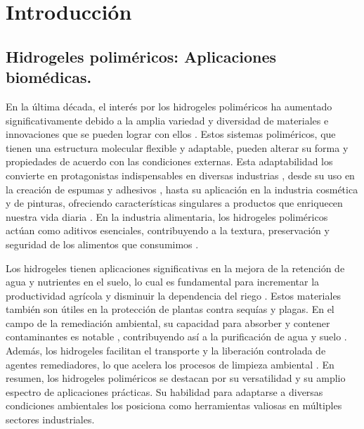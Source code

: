 
\chapter{Introducci\'on}
\label{Chapter1} %



\section{Hidrogeles polim\'ericos: Aplicaciones biom\'edicas.} 

En la \'ultima d\'ecada, el inter\'es por los hidrogeles polim\'ericos ha aumentado significativamente debido a la amplia variedad y diversidad de materiales e innovaciones que se pueden lograr con ellos .
Estos sistemas polim\'ericos, que tienen una estructura molecular flexible y adaptable, pueden alterar su forma y propiedades de acuerdo con las condiciones externas.
Esta adaptabilidad los convierte en protagonistas indispensables en diversas industrias \cite{zhu2022review}, desde su uso en la creaci\'on de espumas y adhesivos \cite{wu2021review, chowdhury2019novel}, hasta su aplicaci\'on en la industria cosm\'etica y de pinturas, ofreciendo caracter\'isticas singulares a productos que enriquecen nuestra vida diaria \cite{hirst2019fundamentals}.
En la industria alimentaria, los hidrogeles polim\'ericos act\'uan como aditivos esenciales, contribuyendo a la textura, preservaci\'on y seguridad de los alimentos que consumimos \cite{kwok2019microgel}.

Los hidrogeles tienen aplicaciones significativas en la mejora de la retenci\'on de agua y nutrientes en el suelo, lo cual es fundamental para incrementar la productividad agr\'icola y disminuir la dependencia del riego \cite{el2004radiation}. Estos materiales tambi\'en son \'utiles en la protecci\'on de plantas contra sequ\'ias y plagas.
En el campo de la remediaci\'on ambiental, su capacidad para absorber y contener contaminantes es notable \cite{perez2018using,perez2019molecular}, contribuyendo as\'i a la purificaci\'on de agua y suelo \cite{mehrotra2021use}. Adem\'as, los hidrogeles facilitan el transporte y la liberaci\'on controlada de agentes remediadores, lo que acelera los procesos de limpieza ambiental \cite{mehrotra2021use}.
En resumen, los hidrogeles polim\'ericos se destacan por su versatilidad y su amplio espectro de aplicaciones pr\'acticas. Su habilidad para adaptarse a diversas condiciones ambientales los posiciona como herramientas valiosas en m\'ultiples sectores industriales.


